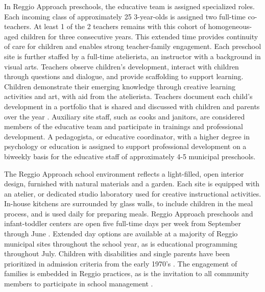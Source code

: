 In Reggio Approach preschools, the educative team is assigned specialized roles. Each incoming class of approximately 25 3-year-olds is assigned two full-time co-teachers. At least 1 of the 2 teachers remains with this cohort of homogeneous-aged children for three consecutive years. This extended time provides continuity of care for children and enables strong teacher-family engagement. Each preschool site is further staffed by a full-time atelierista, an instructor with a background in visual arts. Teachers observe children's development, interact with children through questions and dialogue, and provide scaffolding to support learning. Children demonstrate their emerging knowledge through creative learning activities and art, with aid from the atelierista. Teachers document each child's development in a portfolio that is shared and discussed with children and parents over the year \citep{Rinaldi_2006_ReggioEmilia_BOOK,Giudici-Nicolosi_2014_Reggio-Approach}. Auxiliary site staff, such as cooks and janitors, are considered members of the educative team and participate in trainings and professional development. A pedagogista, or educative coordinator, with a higher degree in psychology or education is assigned to support professional development on a biweekly basis for the educative staff of approximately 4-5 municipal preschools. 

The Reggio Approach school environment reflects a light-filled, open interior design, furnished with natural materials and a garden. Each site is equipped with an atelier, or dedicated studio laboratory used for creative instructional activities. In-house kitchens are surrounded by glass walls, to include children in the meal process, and is used daily for preparing meals. Reggio Approach preschools and infant-toddler centers are open five full-time days per week from September through June \citep{Giudici-Nicolosi_2014_Reggio-Approach}. Extended day options are available at a majority of Reggio municipal sites throughout the school year, as is educational programming throughout July. Children with disabilities and single parents have been prioritized in admission criteria from the early 1970's \citep{Edwards-etal-eds_1998_Hundred-Languages}. The engagement of families is embedded in Reggio practices, as is the invitation to all community members to participate in school management \citep{CEHD_2016_Historical-Analysis,Cagliari-etal-eds_2016_BOOK_Loris-Malaguzzi}. 

